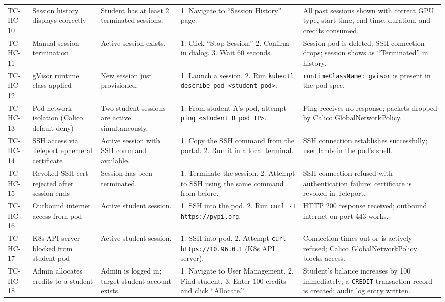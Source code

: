 \documentclass[12pt,a4paper]{article}
\begin{document}
\begin{longtable}{@{}L{2cm}L{3cm}L{3cm}L{3.5cm}L{3cm}@{}}
    TC-HC-10 & Session history displays correctly & Student has at least 2 terminated sessions. & 1. Navigate to ``Session History'' page. & All past sessions shown with correct GPU type, start time, end time, duration, and credits consumed. \\
  TC-HC-11 & Manual session termination & Active session exists. & 1. Click ``Stop Session.'' 2. Confirm in dialog. 3. Wait 60 seconds. & Session pod is deleted; SSH connection drops; session shows as ``Terminated'' in history. \\
    TC-HC-12 & gVisor runtime class applied & New session just provisioned. & 1. Launch a session. 2. Run \texttt{kubectl describe pod <student-pod>}. & \texttt{runtimeClassName: gvisor} is present in the pod spec. \\
  TC-HC-13 & Pod network isolation (Calico default-deny) & Two student sessions are active simultaneously. & 1. From student A's pod, attempt \texttt{ping <student B pod IP>}. & Ping receives no response; packets dropped by Calico GlobalNetworkPolicy. \\
    TC-HC-14 & SSH access via Teleport ephemeral certificate & Active session with SSH command available. & 1. Copy the SSH command from the portal. 2. Run it in a local terminal. & SSH connection establishes successfully; user lands in the pod's shell. \\
  TC-HC-15 & Revoked SSH cert rejected after session ends & Session has been terminated. & 1. Terminate the session. 2. Attempt to SSH using the same command from before. & SSH connection refused with authentication failure; certificate is revoked in Teleport. \\
    TC-HC-16 & Outbound internet access from pod & Active student session. & 1. SSH into the pod. 2. Run \texttt{curl -I https://pypi.org}. & HTTP 200 response received; outbound internet on port 443 works. \\
  TC-HC-17 & K8s API server blocked from student pod & Active student session. & 1. SSH into pod. 2. Attempt \texttt{curl https://10.96.0.1} (K8s API server). & Connection times out or is actively refused; Calico GlobalNetworkPolicy blocks access. \\
    TC-HC-18 & Admin allocates credits to a student & Admin is logged in; target student account exists. & 1. Navigate to User Management. 2. Find student. 3. Enter 100 credits and click ``Allocate.'' & Student's balance increases by 100 immediately; a \texttt{CREDIT} transaction record is created; audit log entry written. \\

\end{longtable}
\end{document}
